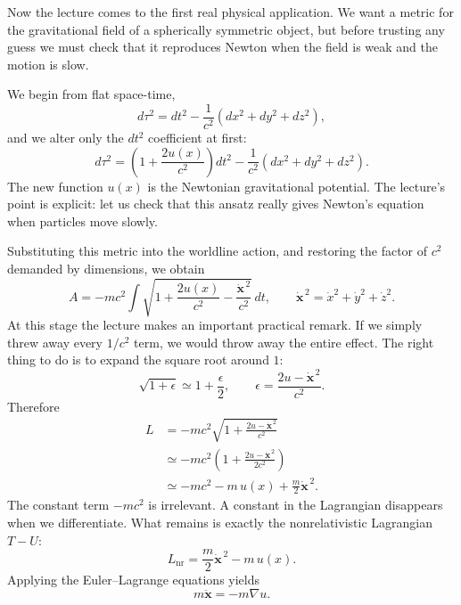 Now the lecture comes to the first real physical application. We want a metric for the gravitational field of a spherically symmetric object, but before trusting any guess we must check that it reproduces Newton when the field is weak and the motion is slow.

We begin from flat space-time,
\begin{equation}
d\tau^2 = dt^2 - \frac{1}{c^2}(dx^2+dy^2+dz^2),
\end{equation}
and we alter only the \(dt^2\) coefficient at first:
\begin{equation}
d\tau^2 = \left(1+\frac{2u(x)}{c^2}\right)dt^2 - \frac{1}{c^2}(dx^2+dy^2+dz^2).
\end{equation}
The new function \(u(x)\) is the Newtonian gravitational potential. The lecture's point is explicit: let us check that this ansatz really gives Newton's equation when particles move slowly.

Substituting this metric into the worldline action, and restoring the factor of \(c^2\) demanded by dimensions, we obtain
\begin{equation}
A=-mc^2\int \sqrt{1+\frac{2u(x)}{c^2}-\frac{\dot{\mathbf x}^{\,2}}{c^2}}\,dt,
\qquad
\dot{\mathbf x}^{\,2}=\dot x^2+\dot y^2+\dot z^2.
\end{equation}
At this stage the lecture makes an important practical remark. If we simply threw away every \(1/c^2\) term, we would throw away the entire effect. The right thing to do is to expand the square root around \(1\):
\begin{equation}
\sqrt{1+\epsilon}\simeq 1+\frac{\epsilon}{2},
\qquad
\epsilon=\frac{2u-\dot{\mathbf x}^{\,2}}{c^2}.
\end{equation}
Therefore
\begin{align}
L
&= -mc^2\sqrt{1+\frac{2u-\dot{\mathbf x}^{\,2}}{c^2}} \\
&\simeq -mc^2\left(1+\frac{2u-\dot{\mathbf x}^{\,2}}{2c^2}\right) \\
&\simeq -mc^2 - m\,u(x) + \frac{m}{2}\dot{\mathbf x}^{\,2}.
\end{align}
The constant term \(-mc^2\) is irrelevant. A constant in the Lagrangian disappears when we differentiate. What remains is exactly the nonrelativistic Lagrangian \(T-U\):
\begin{equation}
L_{\mathrm{nr}} = \frac{m}{2}\dot{\mathbf x}^{\,2} - m\,u(x).
\end{equation}
Applying the Euler--Lagrange equations yields
\begin{equation}
m\ddot{\mathbf x} = -m\nabla u.
\end{equation}


